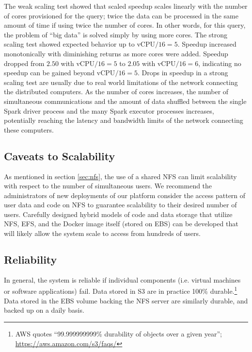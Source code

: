 \documentclass[twocolumn, linenumbers]{aastex631}
\begin{document}
The weak scaling test showed that scaled speedup scales linearly with the number of cores provisioned for the query; twice the data can be processed in the same amount of time if using twice the number of cores. In other words, for this query, the problem of ``big data'' is solved simply by using more cores. The strong scaling test showed expected behavior up to $\text{vCPU}/16 = 5$. Speedup increased monotonically with diminishing returns as more cores were added. Speedup dropped from $2.50$ with $\text{vCPU}/16 = 5$ to $2.05$ with $\text{vCPU}/16 = 6$, indicating no speedup can be gained beyond $\text{vCPU}/16 = 5$. Drops in speedup in a strong scaling test are usually due to real world limitations of the network connecting the distributed computers. As the number of cores increases, the number of simultaneous communications and the amount of data shuffled between the single Spark driver process and the many Spark executor processes increases, potentially reaching the latency and bandwidth limits of the network connecting these computers.

\subsection{Caveats to Scalability}

As mentioned in section \ref{sec:nfs}, the use of a shared NFS can limit scalability with respect to the number of simultaneous users. We recommend the administrators of new deployments of our platform consider the access pattern of user data and code on NFS to guarantee scalability to their desired number of users. Carefully designed hybrid models of code and data storage that utilize NFS, EFS, and the Docker image itself (stored on EBS) can be developed that will likely allow the system scale to access from hundreds of users.

\subsection{Reliability}

In general, the system is reliable if individual components (i.e. virtual machines or software applications) fail. Data stored in S3 are in practice 100\% durable.\footnote{AWS quotes ``99.999999999\% durability of objects over a given year''; \url{https://aws.amazon.com/s3/faqs/}} Data stored in the EBS volume backing the NFS server are similarly durable, and backed up on a daily basis.
\end{document}
